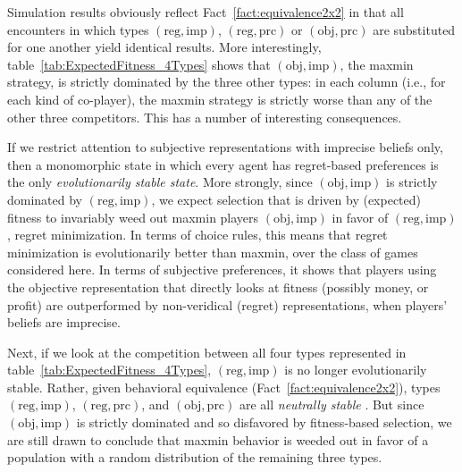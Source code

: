 \documentclass[fleqn,reqno,12pt]{article}
\theoremstyle{Satz}
\theoremstyle{Bsp}
\begin{document}
Simulation results obviously reflect Fact~\ref{fact:equivalence2x2} in that all encounters in
which types $(\text{reg}, \text{imp})$, $(\text{reg}, \text{prc})$ or
$(\text{obj}, \text{prc})$ are substituted for one another yield identical results. More
interestingly, table~\ref{tab:ExpectedFitness_4Types} shows that $(\text{obj}, \text{imp})$,
the maxmin strategy, is strictly dominated by the three other types: in each column (i.e.,
for each kind of co-player), the maxmin strategy is strictly worse than any of the other three
competitors. This has a number of interesting consequences.

If we restrict attention to subjective representations with imprecise beliefs only, then a monomorphic state in which every agent has
regret-based preferences is the only \emph{evolutionarily stable state}. More strongly, since
$(\text{obj}, \text{imp})$ is strictly dominated by $(\text{reg}, \text{imp})$, we expect
selection that is driven by (expected) fitness to invariably weed out maxmin players $(\text{obj}, \text{imp})$ in favor of $(\text{reg}, \text{imp})$, regret minimization. 
In terms of choice rules, this means that regret
minimization is evolutionarily better than maxmin, over the class of games considered here. In terms of subjective preferences, it shows that players using the objective representation that directly looks at fitness (possibly money, or profit) are outperformed by non-veridical (regret) representations, when players' beliefs are imprecise.

Next, if we look at the competition between all four types represented in
table~\ref{tab:ExpectedFitness_4Types}, $(\text{reg}, \text{imp})$ is no longer evolutionarily
stable. Rather, given behavioral equivalence (Fact~\ref{fact:equivalence2x2}), types
$(\text{reg}, \text{imp})$, $(\text{reg}, \text{prc})$, and $(\text{obj}, \text{prc})$ are all
\emph{neutrally stable} \citep{Maynard-Smith1982:Evolution-and-t}. But since
$(\text{obj}, \text{imp})$ is strictly dominated and so disfavored by fitness-based selection,
we are still drawn to conclude that maxmin behavior is weeded out in favor of a population with
a random distribution of the remaining three types.
\end{document}
